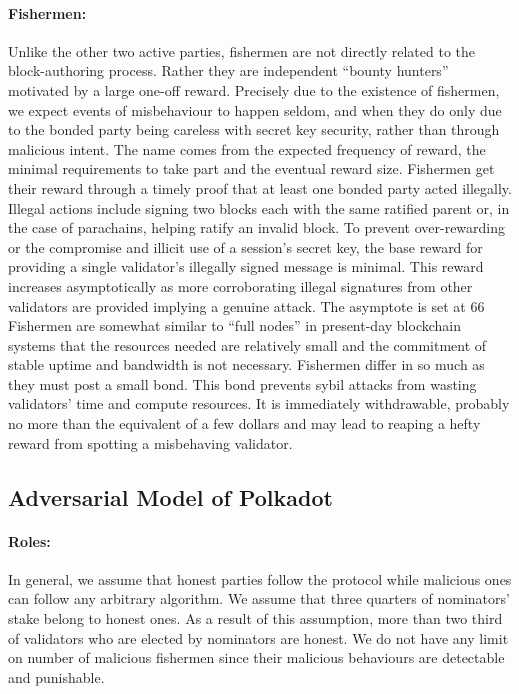 \paragraph{Fishermen:} \label{par:fishermen} Unlike the other two active parties, fishermen are not directly related to the block-authoring process. Rather they are independent “bounty hunters” motivated by a large one-off reward. Precisely due to
the existence of fishermen, we expect events of misbehaviour to happen seldom, and when they do only due to the bonded party being careless with secret key security, rather than through malicious intent. The name comes from the expected frequency of reward, the minimal requirements to take part and the eventual reward size.
Fishermen get their reward through a timely proof that at least one bonded party acted illegally. Illegal actions include signing two blocks each with the same ratified parent or, in the case of parachains, helping ratify an invalid block. To prevent over-rewarding or the compromise and illicit use of a session’s secret key, the base reward for providing a single validator’s illegally signed message is minimal. This reward increases asymptotically as more corroborating illegal signatures from other validators are provided implying a genuine attack. The asymptote is set at 66 %
Fishermen are somewhat similar to “full nodes” in present-day blockchain systems that the resources needed are relatively small and the commitment of stable uptime and bandwidth is not necessary. Fishermen differ in so much as they must post a small bond. This bond prevents sybil attacks from wasting validators’ time and compute resources. It is immediately withdrawable, probably no more than the equivalent of a few dollars and may lead to reaping a hefty reward from spotting a misbehaving validator.


\subsection{Adversarial Model of Polkadot}

\paragraph{Roles:} In general, we assume that honest parties follow the protocol while malicious ones can follow any arbitrary algorithm. We assume that three quarters of nominators' stake belong to honest ones. As a result of this assumption, more than two third of validators who are elected by nominators are honest. We do not have any limit on number of malicious fishermen since their malicious behaviours are detectable and punishable.  

